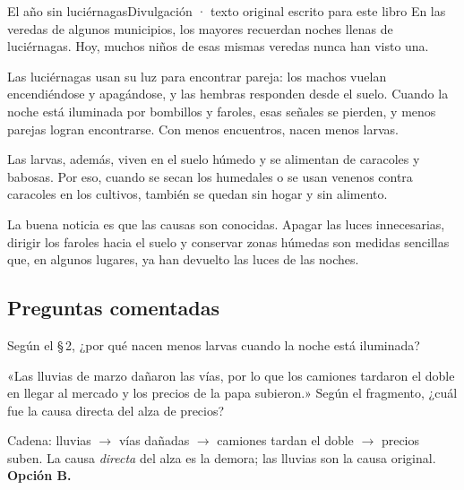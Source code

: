 \begin{texto}{El año sin luciérnagas}{Divulgación · texto original escrito para este libro}
\pa En las veredas de algunos municipios, los mayores recuerdan noches llenas de luciérnagas. Hoy, muchos niños de esas
mismas veredas nunca han visto una.

\pa Las luciérnagas usan su luz para encontrar pareja: los machos vuelan encendiéndose y apagándose, y las hembras
responden desde el suelo. Cuando la noche está iluminada por bombillos y faroles, esas señales se pierden, y menos parejas
logran encontrarse. Con menos encuentros, nacen menos larvas.

\pa Las larvas, además, viven en el suelo húmedo y se alimentan de caracoles y babosas. Por eso, cuando se secan los
humedales o se usan venenos contra caracoles en los cultivos, también se quedan sin hogar y sin alimento.

\pa La buena noticia es que las causas son conocidas. Apagar las luces innecesarias, dirigir los faroles hacia el suelo y
conservar zonas húmedas son medidas sencillas que, en algunos lugares, ya han devuelto las luces de las noches.
\end{texto}

\subsection{Preguntas comentadas}
\begin{comentada}{Según el \S\,2, ¿por qué nacen menos larvas cuando la noche está iluminada?}
\end{comentada}

\begin{reto}
«Las lluvias de marzo dañaron las vías, por lo que los camiones tardaron el doble en llegar al mercado y los precios de
la papa subieron.» Según el fragmento, ¿cuál fue la causa directa del alza de precios?
\end{reto}

\begin{retoresuelto}
Cadena: lluvias $\to$ vías dañadas $\to$ camiones tardan el doble $\to$ precios suben. La causa \emph{directa} del alza es
la demora; las lluvias son la causa original. \textbf{Opción B.}
\end{retoresuelto}

